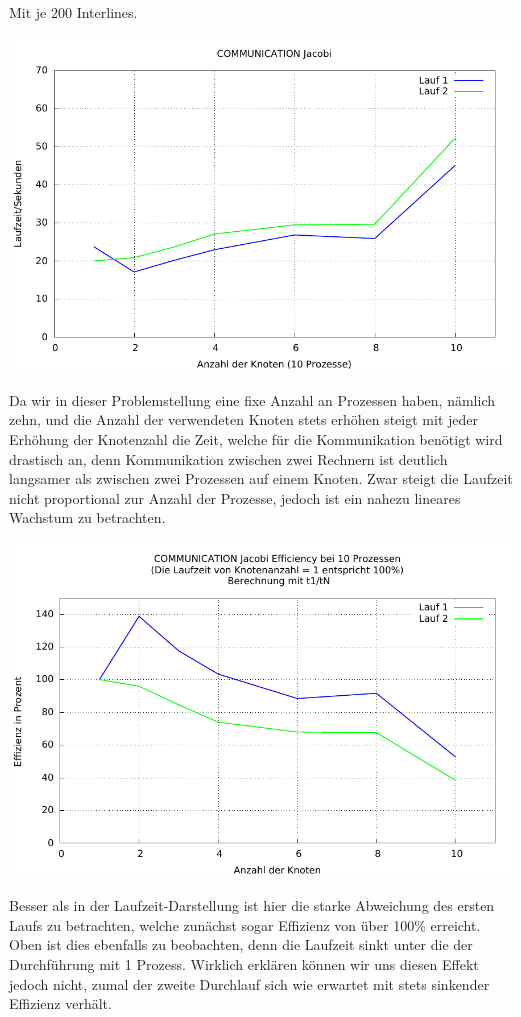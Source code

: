 \documentclass[a4paper]{article}
\begin{document}
Mit je 200 Interlines.

\includegraphics[scale=0.8]{img/COMMUNICATION_JA_laufzeit.pdf}

Da wir in dieser Problemstellung eine fixe Anzahl an Prozessen haben, nämlich zehn, und die Anzahl der verwendeten Knoten stets erhöhen steigt mit jeder Erhöhung der Knotenzahl die Zeit, welche für die Kommunikation benötigt wird drastisch an, denn Kommunikation zwischen zwei Rechnern ist deutlich langsamer als zwischen zwei Prozessen auf einem Knoten. Zwar steigt die Laufzeit nicht proportional zur Anzahl der Prozesse, jedoch ist ein nahezu lineares Wachstum zu betrachten.

\includegraphics[scale=0.8]{img/COMMUNICATION_JA_efficiency.pdf}

Besser als in der Laufzeit-Darstellung ist hier die starke Abweichung des ersten Laufs zu betrachten, welche zunächst sogar Effizienz von über 100\% erreicht. Oben ist dies ebenfalls zu beobachten, denn die Laufzeit sinkt unter die der Durchführung mit 1 Prozess. Wirklich erklären können wir uns diesen Effekt jedoch nicht, zumal der zweite Durchlauf sich wie erwartet mit stets sinkender Effizienz verhält.
\end{document}
